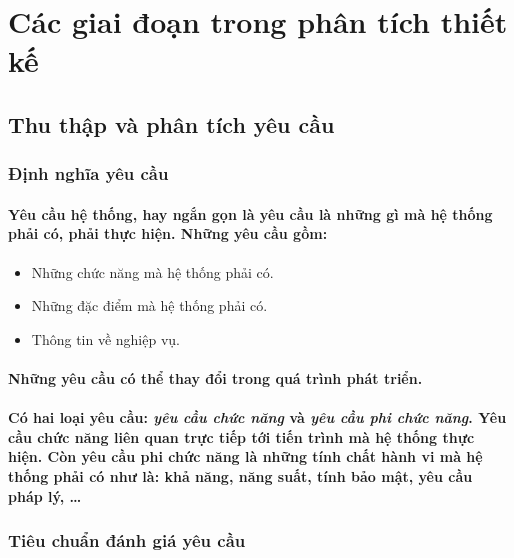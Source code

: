 \documentclass{article}
\begin{document}
\section{Các giai đoạn trong phân tích thiết kế}

  \subsection{Thu thập và phân tích yêu cầu}
  
  \subsubsection{Định nghĩa yêu cầu}
    \paragraph{\textnormal{
      \textbf{Yêu cầu hệ thống}, hay ngắn gọn là \textbf{yêu cầu} là những gì mà hệ thống phải có, phải thực hiện. Những yêu cầu gồm:
    }}
    \begin{itemize}
      \item Những chức năng mà hệ thống phải có.
      \item Những đặc điểm mà hệ thống phải có.
      \item Thông tin về nghiệp vụ.
    \end{itemize}

    \paragraph{\textnormal{
      Những yêu cầu có thể thay đổi trong quá trình phát triển.
    }}

    \paragraph{\textnormal{
      Có hai loại yêu cầu: \textit{yêu cầu chức năng} và \textit{yêu cầu phi chức năng}. Yêu cầu chức năng liên quan trực tiếp tới tiến trình mà hệ thống thực hiện. Còn yêu cầu phi chức năng là những tính chất hành vi mà hệ thống phải có như là: khả năng, năng suất, tính bảo mật, yêu cầu pháp lý, \ldots
    }}
  
  \subsubsection{Tiêu chuẩn đánh giá yêu cầu}
\end{document}
